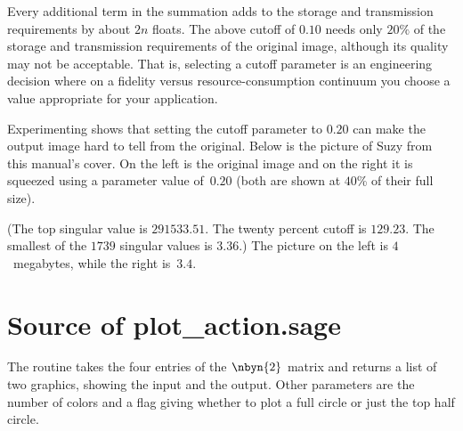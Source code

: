 Every additional term in the summation
adds to the storage and transmission requirements by about $2n$ floats.
The above cutoff of $0.10$ needs 
only $20\%$ of the storage
and transmission requirements of the original image,
although its quality may not be acceptable.
That is, selecting a cutoff parameter is an engineering decision where
on a fidelity versus resource-consumption continuum 
you choose a value appropriate for your application.
 
Experimenting shows that setting
the cutoff parameter to $0.20$ can make the output image hard to tell
from the original.
Below is the picture of Suzy 
from this manual's cover.
On the left is the original image
and on the right it is squeezed using a parameter value of~$0.20$
(both are shown at $40$\% of their full size).
\begin{center}
  \quad
\end{center}
(The top singular value is 
$291533.51$.
The twenty percent cutoff is $129.23$. 
The smallest of the $1739$ singular values is $3.36$.)
The picture on the left is $4$~megabytes, 
while the right is~$3.4$.


\section{Source of plot\_action.sage}

The 
routine takes the four entries of the $\nbyn{2}$
matrix and returns a list of two graphics, showing the input and the
output.
Other parameters are the number of colors and a flag giving whether
to plot a full circle or just the top half circle.


